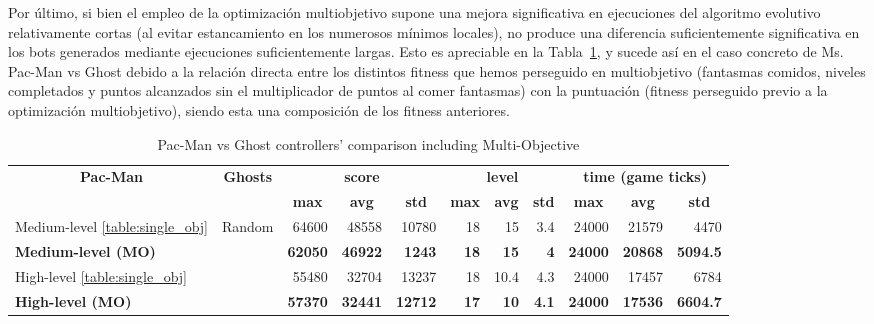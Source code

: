 Por último, si bien el empleo de la optimización multiobjetivo supone una mejora significativa en ejecuciones del algoritmo evolutivo relativamente cortas (al evitar estancamiento en los numerosos mínimos locales), no produce una diferencia suficientemente significativa en los bots generados mediante ejecuciones suficientemente largas. Esto es apreciable en la Tabla~\ref{table:multi-objective}, y sucede así en el caso concreto de Ms. Pac-Man vs Ghost debido a la relación directa entre los distintos fitness que hemos perseguido en multiobjetivo (fantasmas comidos, niveles completados y puntos alcanzados sin el multiplicador de puntos al comer fantasmas) con la puntuación (fitness perseguido previo a la optimización multiobjetivo), siendo esta una composición de los fitness anteriores.
\begin{table}[tb]
\centering
\caption{Pac-Man vs Ghost controllers' comparison including Multi-Objective}
\label{table:multi-objective}
\begin{tabular}{|l|c|r|r|r|r|r|r|r|r|r|}
\hline
\multicolumn{1}{|c|}{\multirow{2}{*}{\textbf{Pac-Man}}} & \multirow{2}{*}{\textbf{Ghosts}} & \multicolumn{3}{c|}{\textbf{score}} & \multicolumn{3}{c|}{\textbf{level}} & \multicolumn{3}{c|}{\textbf{time (game ticks)}} \\ \cline{3-11} 
\multicolumn{1}{|c|}{} &  & \multicolumn{1}{c|}{\textbf{max}} & \multicolumn{1}{c|}{\textbf{avg}} & \multicolumn{1}{c|}{\textbf{std}} & \multicolumn{1}{c|}{\textbf{max}} & \multicolumn{1}{c|}{\textbf{avg}} & \multicolumn{1}{c|}{\textbf{std}} & \multicolumn{1}{c|}{\textbf{max}} & \multicolumn{1}{c|}{\textbf{avg}} & \multicolumn{1}{c|}{\textbf{std}} \\ \hline
Medium-level \ref{table:single_obj} & \multirow{4}{*}{Random} & {64600} & {48558} & {10780} & {18} & {15} & {3.4} & {24000} & {21579} & {4470} \\ \cline{1-1} \cline{3-11} 
\textbf{Medium-level (MO)} &  & \textbf{62050} & \textbf{46922} & \textbf{1243} & \textbf{18} & \textbf{15} & \textbf{4} & \textbf{24000} & \textbf{20868} & \textbf{5094.5} \\ \cline{1-1} \cline{3-11} 
{High-level \ref{table:single_obj}} &  & {55480} & {32704} & {13237} & {18} & {10.4} & {4.3} & {24000} & {17457} & {6784} \\ \cline{1-1} \cline{3-11} 
\textbf{High-level (MO)} &  & \textbf{57370} & \textbf{32441} & \textbf{12712} & \textbf{17} & \textbf{10} & \textbf{4.1} & \textbf{24000} & \textbf{17536} & \textbf{6604.7} \\ \hline

\end{tabular}
\end{table}
